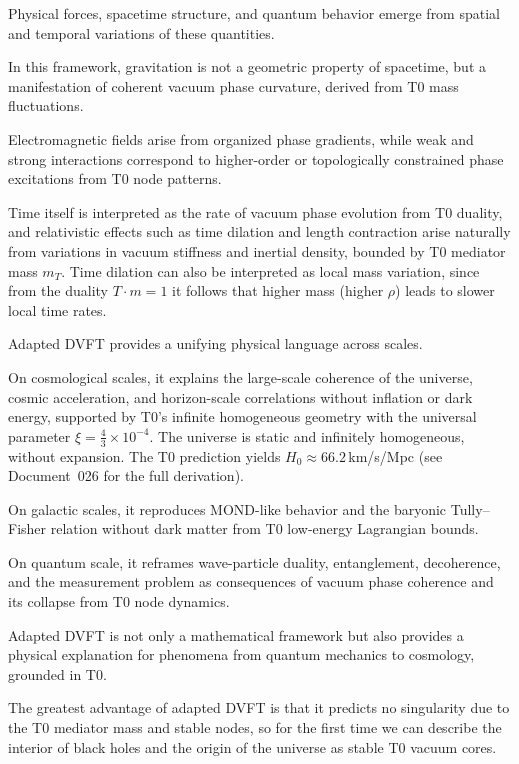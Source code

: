 	Physical forces, spacetime structure, and quantum behavior emerge from spatial and temporal variations of these quantities.
	
	In this framework, gravitation is not a geometric property of spacetime, but a manifestation of coherent vacuum phase curvature, derived from T0 mass fluctuations.
	
	Electromagnetic fields arise from organized phase gradients, while weak and strong interactions correspond to higher-order or topologically constrained phase excitations from T0 node patterns.
	
	Time itself is interpreted as the rate of vacuum phase evolution from T0 duality, and relativistic effects such as time dilation and length contraction arise naturally from variations in vacuum stiffness and inertial density, bounded by T0 mediator mass $m_T$. Time dilation can also be interpreted as local mass variation, since from the duality $T \cdot m = 1$ it follows that higher mass (higher $\rho$) leads to slower local time rates.
	
	Adapted DVFT provides a unifying physical language across scales.
	
	On cosmological scales, it explains the large-scale coherence of the universe, cosmic acceleration, and horizon-scale correlations without inflation or dark energy, supported by T0's infinite homogeneous geometry with the universal parameter $\xi = \frac{4}{3} \times 10^{-4}$. The universe is static and infinitely homogeneous, without expansion. The T0 prediction yields $H_0 \approx 66.2\,$km/s/Mpc (see Document~026 for the full derivation).
	
	On galactic scales, it reproduces MOND-like behavior and the baryonic Tully–Fisher relation without dark matter from T0 low-energy Lagrangian bounds.
	
	On quantum scale, it reframes wave-particle duality, entanglement, decoherence, and the measurement problem as consequences of vacuum phase coherence and its collapse from T0 node dynamics.
	
	Adapted DVFT is not only a mathematical framework but also provides a physical explanation for phenomena from quantum mechanics to cosmology, grounded in T0.
	
	The greatest advantage of adapted DVFT is that it predicts no singularity due to the T0 mediator mass and stable nodes, so for the first time we can describe the interior of black holes and the origin of the universe as stable T0 vacuum cores.
	
